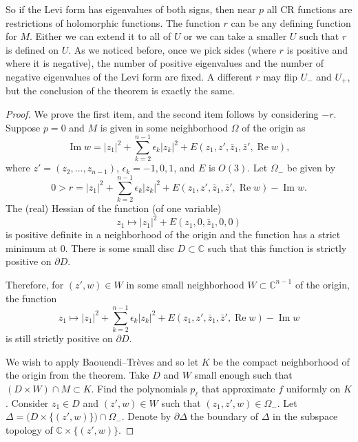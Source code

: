 \documentclass[12pt,openany]{book}
\renewcommand{\Re}{\operatorname{Re}}
\renewcommand{\Im}{\operatorname{Im}}
\newcommand{\sabs}[1]{\lvert {#1} \rvert}
\newcommand{\C}{{\mathbb{C}}}
\theoremstyle{plain}
\theoremstyle{remark}
\theoremstyle{definition}
\theoremstyle{exercise}
\theoremstyle{example}
\begin{document}
So if the Levi form has eigenvalues of both signs,
then near $p$ all CR functions are restrictions of holomorphic
functions.
The function $r$ can be any defining
function for $M$.  Either we can extend it to all of $U$ or we can take a
smaller $U$ such that $r$ is defined on $U$.  As we noticed before,
once we pick sides (where $r$ is positive and where it is negative),
the number of positive eigenvalues and the number of negative eigenvalues of
the Levi form are fixed.  A different $r$ may flip $U_-$
and $U_+$, but the conclusion of the theorem is exactly the same.

\begin{proof}
We prove the first item, and the second item follows by considering $-r$.
Suppose $p = 0$ and $M$ is given in some neighborhood
$\Omega$ of the origin as
\begin{equation*}
\Im w = \sabs{z_1}^2 + \sum_{k=2}^{n-1} \epsilon_k \sabs{z_k}^2 +
E(z_1,z',\bar{z}_1,\bar{z}',\Re w) ,
\end{equation*}
where $z' = (z_2,\ldots,z_{n-1})$, $\epsilon_k = -1,0,1$,
and $E$ is $O(3)$.
Let $\Omega_-$ be given by
\begin{equation*}
0 > r = \sabs{z_1}^2 + \sum_{k=2}^{n-1} \epsilon_k \sabs{z_k}^2 +
E(z_1,z',\bar{z}_1,\bar{z}',\Re w) - \Im w .
\end{equation*}
The (real) Hessian of the function (of one variable)
\begin{equation*}
z_1 \mapsto \sabs{z_1}^2 +
E(z_1,0,\bar{z}_1,0,0)
\end{equation*}
is positive definite in a
neighborhood of the origin and the function has a strict minimum at $0$.
There is some small disc $D \subset \C$ such
that this function is strictly positive on $\partial D$.

Therefore, for $(z',w) \in W$ in some
small neighborhood $W \subset \C^{n-1}$ of the origin,
the function
\begin{equation*}
z_1 \mapsto \sabs{z_1}^2 + \sum_{k=2}^{n-1} \epsilon_k \sabs{z_k}^2 +
E(z_1,z',\bar{z}_1,\bar{z}',\Re w) - \Im w
\end{equation*}
is still strictly positive on $\partial D$.

We wish to apply
Baouendi--Tr{\`e}ves and so let $K$ be the compact neighborhood of the
origin from the theorem.  Take $D$ and $W$ small enough such
that $(D \times W) \cap M \subset K$.
Find the polynomials $p_\ell$ that approximate $f$ uniformly on $K$.
Consider $z_1 \in D$ and $(z',w) \in W$ such that
$(z_1,z',w) \in \Omega_-$.
Let
$\Delta = \bigl( D \times \{ (z',w) \} \bigr) \cap \Omega_-$.
Denote by $\partial \Delta$ the boundary of $\Delta$ in the subspace topology
of $\C \times \{ (z',w) \}$.


\end{proof}
\end{document}
